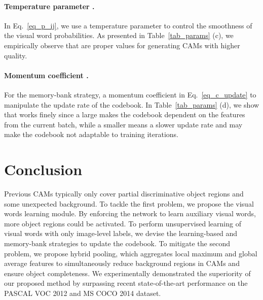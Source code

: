 \paragraph{\textbf{Temperature parameter .}}
\par In Eq.~\eqref{eq_p_ij}, we use a temperature parameter  to control the smoothness of the visual word probabilities. As presented in Table~\ref{tab_params} (c), we empirically observe that  are proper values for generating CAMs with higher quality.

\paragraph{\textbf{Momentum coefficient .}}
\par For the memory-bank strategy, a momentum coefficient  in Eq.~\eqref{eq_c_update} to manipulate the update rate of the codebook. In Table~\ref{tab_params} (d), we show that  works finely since a large  makes the codebook dependent on the features from the current batch, while a smaller  means a slower update rate and may make the codebook not adaptable to training iterations.

\section{Conclusion}
\label{conclusion}
\par Previous CAMs typically only cover partial discriminative object regions and some unexpected background.
To tackle the first problem, we propose the visual words learning module. By enforcing the network to learn auxiliary visual words, more object regions could be activated. To perform unsupervised learning of visual words with only image-level labels, we devise the learning-based and memory-bank strategies to update the codebook.
To mitigate the second problem, we propose hybrid pooling, which aggregates local maximum and global average features to simultaneously reduce background regions in CAMs and ensure object completeness.
We experimentally demonstrated the superiority of our proposed method by surpassing recent state-of-the-art performance on the PASCAL VOC 2012 and MS COCO 2014 dataset.



         





